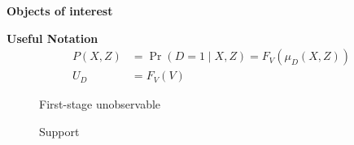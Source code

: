 \begin{frame}\begin{center}
	\LARGE\textbf{Objects of interest}
\end{center}\end{frame}
\begin{frame}
	\textbf{Useful Notation}
	\begin{align*}
		P(X, Z) & = \Pr(D = 1\mid X, Z) = F_V(\mu_D(X, Z)) \\
		U_D     & = F_V(V)
	\end{align*}

\end{frame}

\begin{frame}
\begin{figure}[htp]\centering\caption{First-stage unobservable}
\end{figure}
\end{frame}
\begin{frame}
\begin{figure}[htp]\centering\caption{Support}
\end{figure}
\end{frame}

